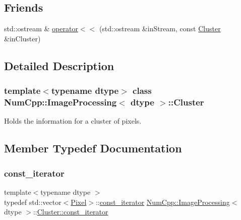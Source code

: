 \subsection*{Friends}
\begin{DoxyCompactItemize}
\item 
std\+::ostream \& \mbox{\hyperlink{class_num_cpp_1_1_image_processing_1_1_cluster_a9b2341014fa476e2540940941d9dcb30}{operator$<$$<$}} (std\+::ostream \&in\+Stream, const \mbox{\hyperlink{class_num_cpp_1_1_image_processing_1_1_cluster}{Cluster}} \&in\+Cluster)
\end{DoxyCompactItemize}


\subsection{Detailed Description}
\subsubsection*{template$<$typename dtype$>$\newline
class Num\+Cpp\+::\+Image\+Processing$<$ dtype $>$\+::\+Cluster}

Holds the information for a cluster of pixels. 

\subsection{Member Typedef Documentation}
\mbox{\label{class_num_cpp_1_1_image_processing_1_1_cluster_a8f26defce53112d60fd1a178b5669ce6}} 
\subsubsection{\texorpdfstring{const\+\_\+iterator}{const\_iterator}}
{\footnotesize\ttfamily template$<$typename dtype $>$ \\
typedef std\+::vector$<$\mbox{\hyperlink{class_num_cpp_1_1_image_processing_1_1_pixel}{Pixel}}$>$\+::\mbox{\hyperlink{class_num_cpp_1_1_image_processing_1_1_cluster_a8f26defce53112d60fd1a178b5669ce6}{const\+\_\+iterator}} \mbox{\hyperlink{class_num_cpp_1_1_image_processing}{Num\+Cpp\+::\+Image\+Processing}}$<$ dtype $>$\+::\mbox{\hyperlink{class_num_cpp_1_1_image_processing_1_1_cluster_a8f26defce53112d60fd1a178b5669ce6}{Cluster\+::const\+\_\+iterator}}}



